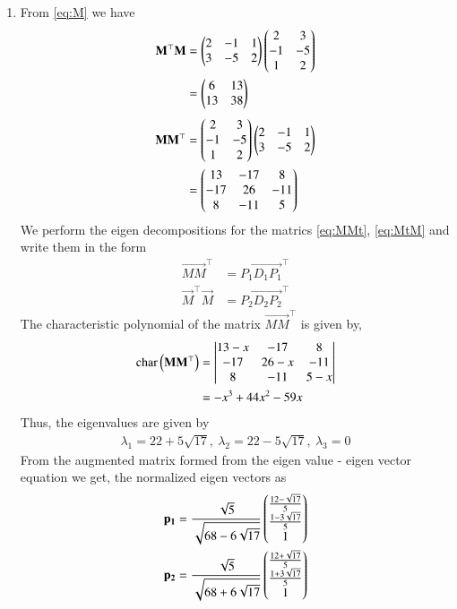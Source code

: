 \documentclass[journal,12pt,twocolumn]{IEEEtran}
\begin{document}
\begin{enumerate}
\begin{enumerate}
\item From \eqref{eq:M} we have
\begin{align}
\mathbf{M}^\top\mathbf{M} &= \begin{pmatrix}2&-1&1\\3&-5&2\end{pmatrix}\begin{pmatrix}2&3\\-1&-5\\1&2\end{pmatrix} \\ 
&= \begin{pmatrix}6&13\\13&38\end{pmatrix} \label{eq:MtM}
\end{align}
\begin{align}
\mathbf{MM}^\top &= \begin{pmatrix}2&3\\-1&-5\\1&2\end{pmatrix}\begin{pmatrix}2&-1&1\\3&-5&2\end{pmatrix}\\
&= \begin{pmatrix}13&-17&8\\-17&26&-11\\8&-11&5\end{pmatrix} \label{eq:MMt}
\end{align}
We perform the eigen decompositions for the matrics \eqref{eq:MMt}, \eqref{eq:MtM} and write them in the form
\begin{align}
    \vec{MM}^\top &= \vec{P_1D_1P_1}^\top \label{eq:decomp-1} \\
    \vec{M}^\top\vec{M} &= \vec{P_2D_2P_2}^\top \label{eq:decomp-2}
\end{align}
The characteristic polynomial of the matrix $\vec{MM}^\top$ is given by,
\begin{align}
\text{char}\left(\mathbf{MM}^\top\right) &= \begin{vmatrix}13-x&-17&8\\-17&26-x&-11\\8&-11&5-x\end{vmatrix} \\
&= -x^3 + 44x^2-59x
\label{eq:char-1}
\end{align}
Thus, the eigenvalues are given by
\begin{align}
\lambda_1 = 22+5\sqrt{17},\ \lambda_2 = 22-5\sqrt{17},\ \lambda_3 = 0
\end{align}
From the augmented matrix formed from the eigen value - eigen vector equation we get, the normalized eigen vectors as
\begin{align}
    \vec{p_1} &= \frac{\sqrt{5}}{\sqrt{68-6\sqrt{17}}} \myvec{\frac{12-\sqrt{17}}{5}\\\frac{1-3\sqrt{17}}{5}\\1}\\
    \vec{p_2} &= \frac{\sqrt{5}}{\sqrt{68+6\sqrt{17}}} \myvec{\frac{12+\sqrt{17}}{5}\\\frac{1+3\sqrt{17}}{5}\\1}\\

\end{align}
\end{enumerate}
\end{enumerate}
\end{document}
